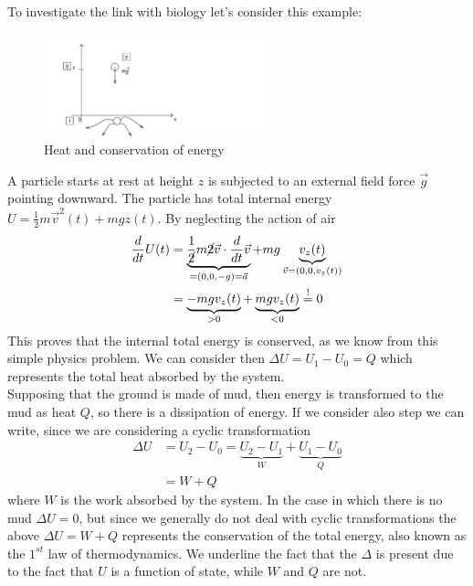 \documentclass[../main/main.tex]{subfiles}
\begin{document}
To investigate the link with biology let's consider this example:
\begin{figure}[ht!]
    \centering
    \includegraphics[width=0.6\textwidth]{../frontespizio/tikz/0_lesson/00_1.pdf}
    \caption{Heat and conservation of energy}
\end{figure}
A particle starts at rest at height $z$ is subjected to an external field force $\vec{g}$ pointing downward. The particle has total internal energy $U = \frac{1}{2}m\vec{v}^2(t)+mgz(t)$. By neglecting the action of air
\begin{equation*}
    \begin{split}
        \frac{d}{dt}U(t) & =\underbrace{\frac{1}{\cancel{2}}m\cancel{2}\vec{v}\cdot\frac{d}{dt}\vec{v}}_{=(0,0,-g)=\vec{a}}+mg\underbrace{v_z(t)}_{\vec{v}=(0,0,v_z(t))}\\
        & = \underbrace{-mgv_z(t)}_{>0}+\underbrace{mgv_z(t)}_{<0}\stackrel{!}{=} 0
    \end{split}
\end{equation*}
This proves that the internal total energy is conserved, as we know from this simple physics problem.
We can consider then $\Delta U = U_1-U_0 = Q$ which represents the total heat absorbed by the system.\\
Supposing that the ground is made of mud, then energy is transformed to the mud as heat $Q$, so there is a dissipation of energy. If we consider also step  we can write, since we are considering a cyclic transformation
\begin{equation}
    \begin{split}
        \Delta U &= U_2-U_0 = \underbrace{U_2-U_1}_{W}+\underbrace{U_1-U_0}_{Q}\\
        &=W+Q
    \end{split}
\end{equation}
where $W$ is the work absorbed by the system. In the case in which there is no mud $\Delta U = 0$, but since we generally do not deal with cyclic transformations the above $\Delta U = W+Q$ represents the conservation of the total energy, also known as the $1^{st}$ law of thermodynamics. We underline the fact that the $\Delta$ is present due to the fact that $U$ is a function of state, while $W$ and $Q$ are not. 
\end{document}
